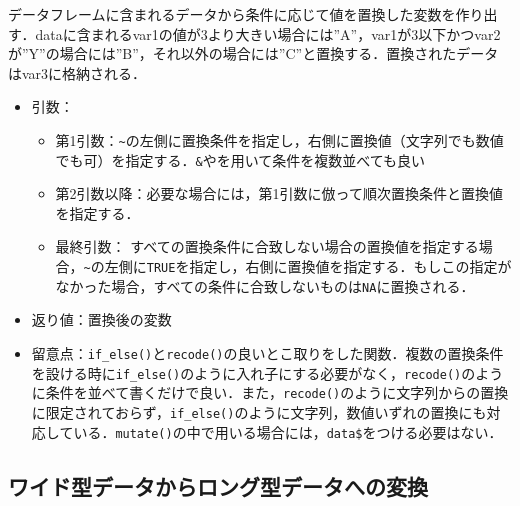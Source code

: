 \documentclass[
  xelatex, ja=standard]{bxjsarticle}
\providecommand{\tightlist}{%
  \setlength{\itemsep}{0pt}\setlength{\parskip}{0pt}}
\begin{document}
データフレームに含まれるデータから条件に応じて値を置換した変数を作り出す．dataに含まれるvar1の値が3より大きい場合には''A''，var1が3以下かつvar2が''Y''の場合には''B''，それ以外の場合には''C''と置換する．置換されたデータはvar3に格納される．

\begin{itemize}
\tightlist
\item
  引数：

  \begin{itemize}
  \tightlist
  \item
    第1引数：\texttt{\textasciitilde{}}の左側に置換条件を指定し，右側に置換値（文字列でも数値でも可）を指定する．\texttt{\&}や\texttt{\textbar{}}を用いて条件を複数並べても良い
  \item
    第2引数以降：必要な場合には，第1引数に倣って順次置換条件と置換値を指定する．
  \item
    最終引数：
    すべての置換条件に合致しない場合の置換値を指定する場合，\texttt{\textasciitilde{}}の左側に\texttt{TRUE}を指定し，右側に置換値を指定する．もしこの指定がなかった場合，すべての条件に合致しないものは\texttt{NA}に置換される．
  \end{itemize}
\item
  返り値：置換後の変数
\item
  留意点：\texttt{if\_else()}と\texttt{recode()}の良いとこ取りをした関数．複数の置換条件を設ける時に\texttt{if\_else()}のように入れ子にする必要がなく，\texttt{recode()}のように条件を並べて書くだけで良い．また，\texttt{recode()}のように文字列からの置換に限定されておらず，\texttt{if\_else()}のように文字列，数値いずれの置換にも対応している．\texttt{mutate()}の中で用いる場合には，\texttt{data\$}をつける必要はない．
\end{itemize}

\subsection{ワイド型データからロング型データへの変換}\label{ux30efux30a4ux30c9ux578bux30c7ux30fcux30bfux304bux3089ux30edux30f3ux30b0ux578bux30c7ux30fcux30bfux3078ux306eux5909ux63db}
\end{document}
